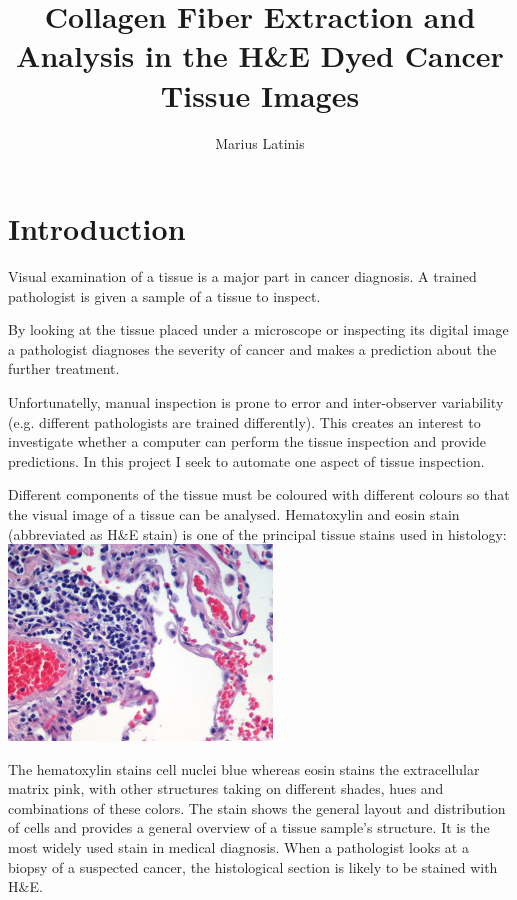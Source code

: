 \documentclass{article}
\begin{document}
\title{Collagen Fiber Extraction and Analysis in the H\&E Dyed Cancer Tissue Images}
\author{Marius Latinis}

\maketitle

\section{Introduction}

Visual examination of a tissue is a major part in cancer diagnosis. A
trained pathologist is given a sample of a tissue to inspect.

By looking at the tissue placed under a microscope or inspecting its digital
image a pathologist diagnoses the severity of cancer and makes a prediction
about the further treatment.

Unfortunatelly, manual inspection is prone to error and inter-observer
variability (e.g. different pathologists are trained differently). This
creates an interest to investigate whether a computer can perform the
tissue inspection and provide predictions. In this project I seek to automate
one aspect of tissue inspection.

Different components of the tissue must be coloured with different colours
so that the visual image of a tissue can be analysed. Hematoxylin and eosin
stain (abbreviated as H\&E stain) is one of the principal tissue stains used
in histology: \\

\includegraphics[width=7cm]{images/example.jpg}

The hematoxylin stains cell nuclei blue whereas eosin
stains the extracellular matrix pink, with other structures taking on
different shades, hues and combinations of these colors. The stain shows
the general layout and distribution of cells and provides a general
overview of a tissue sample's structure. It is the most widely used stain
in medical diagnosis. When a pathologist looks at a biopsy of a suspected
cancer, the histological section is likely to be stained with H\&E.
\end{document}
